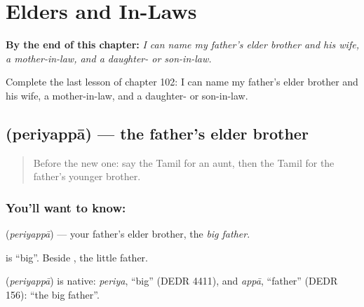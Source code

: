 
\chapter{Elders and In-Laws}
\label{ch:ta-elders-and-in-laws}

\begin{chapteropening}
\textbf{By the end of this chapter:} \emph{I can name my father's elder brother and his wife, a mother-in-law, and a daughter- or son-in-law.}

Complete the last lesson of chapter 102: I can name my father's elder brother and his wife, a mother-in-law, and a daughter- or son-in-law.
\end{chapteropening}

\section[\texorpdfstring{\ta{பெரியப்பா} (periyappā)}{பெரியப்பா (periyappā)}]{ (periyappā) — the father's elder brother}

\label{lesson:TA-C102-fatherselderbrother}



\begin{quote}
Before the new one: say the Tamil for an aunt, then the Tamil for the father's younger brother.
\end{quote}

\subsection*{You'll want to know: }
\textbf{} (\emph{periyappā}) — your father's elder brother, the \emph{big father}.

\textbf{} is \textquotedblleft{}big\textquotedblright{}. Beside \textbf{}, the little father.

\begin{cousinweb}
\textbf{} (\emph{periyappā}) is native: \emph{periya}, \textquotedblleft{}big\textquotedblright{} (DEDR 4411), and \emph{appā}, \textquotedblleft{}father\textquotedblright{} (DEDR 156): \textquotedblleft{}the big father\textquotedblright{}.
\end{cousinweb}

